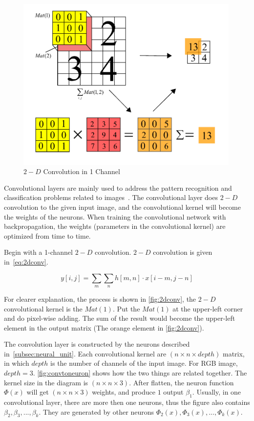 \begin{spacing}{1.5}
\begin{figure}[ht]
\centering
\includegraphics[width=0.99\textwidth, fbox]{Chapter2/2dconv.pdf}
\caption{$2-D$ Convolution in 1 Channel}
\label{fig:2dconv} 
\end{figure}

Convolutional layers are mainly used to address the pattern recognition and classification problems related to images~\cite{o2015introduction}. The convolutional layer does $2-D$ convolution to the given input image, and the convolutional kernel will become the weights of the neurons. When training the convolutional network with backpropagation, the weights (parameters in the convolutional kernel) are optimized from time to time.

Begin with a 1-channel $2-D$ convolution. $2-D$ convolution is given in~\autoref{eq:2dconv}.

\begin{equation}
\label{eq:2dconv}
    y[i,j]= \sum_m \sum_n h[m,n] \cdot x[i-m,j-n]
\end{equation}

For clearer explanation, the process is shown in \autoref{fig:2dconv}, the $2-D$ convolutional kernel is the $Mat(1)$. Put the $Mat(1)$ at the upper-left corner and do pixel-wise adding. The sum of the result would become the upper-left element in the output matrix (The orange element in \autoref{fig:2dconv}).

The convolution layer is constructed by the neurons described in~\autoref{subsec:neural_unit}. Each convolutional kernel are $(n \times n \times depth)$ matrix, in which $depth$ is the number of channels of the input image. For RGB image, $depth = 3$. \autoref{fig:convtoneuron} shows how the two things are related together. The kernel size in the diagram is $(n \times n \times 3)$. After flatten, the neuron function $\Phi(x)$ will get $(n \times n \times 3)$ weights, and produce $1$ output $\beta_1$. Usually, in one convolutional layer, there are more then one neurons, thus the figure also contains $\beta_2, \beta_3, ..., \beta_k$. They are generated by other neurons $\Phi_2(x), \Phi_3(x), ..., \Phi_k(x)$.


\end{spacing}
